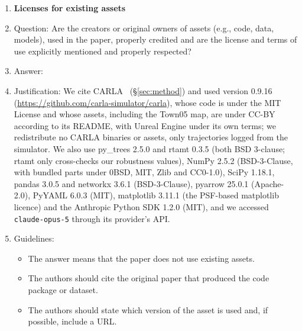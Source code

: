 \begin{enumerate}
\item {\bf Licenses for existing assets}
    \item[] Question: Are the creators or original owners of assets (e.g., code, data, models), used in the paper, properly credited and are the license and terms of use explicitly mentioned and properly respected?
    \item[] Answer: \answerYes{}
    \item[] Justification: We cite CARLA~\citep{dosovitskiy2017carla} (\S\ref{sec:method}) and used version 0.9.16 (\url{https://github.com/carla-simulator/carla}), whose code is under the MIT License and whose assets, including the Town05 map, are under CC-BY according to its README, with Unreal Engine under its own terms; we redistribute no CARLA binaries or assets, only trajectories logged from the simulator. We also use py\_trees 2.5.0 and rtamt 0.3.5 (both BSD 3-clause; rtamt only cross-checks our robustness values), NumPy 2.5.2 (BSD-3-Clause, with bundled parts under 0BSD, MIT, Zlib and CC0-1.0), SciPy 1.18.1, pandas 3.0.5 and networkx 3.6.1 (BSD-3-Clause), pyarrow 25.0.1 (Apache-2.0), PyYAML 6.0.3 (MIT), matplotlib 3.11.1 (the PSF-based matplotlib licence) and the Anthropic Python SDK 1.2.0 (MIT), and we accessed \texttt{claude-opus-5} through its provider's API.
    \item[] Guidelines:
    \begin{itemize}
        \item The answer \answerNA{} means that the paper does not use existing assets.
        \item The authors should cite the original paper that produced the code package or dataset.
        \item The authors should state which version of the asset is used and, if possible, include a URL.

\end{itemize}
\end{enumerate}
